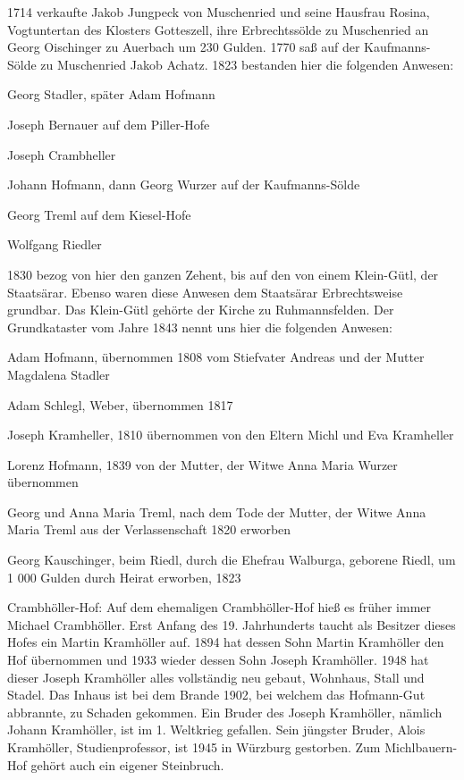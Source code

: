 \documentclass{book}
\begin{document}
1714 verkaufte Jakob Jungpeck von Muschenried und seine Hausfrau Rosina,
Vogtuntertan des Klosters Gotteszell, ihre Erbrechtssölde zu Muschenried an
Georg Oischinger zu Auerbach um 230 Gulden. 1770 saß auf der Kaufmanns-Sölde zu
Muschenried Jakob Achatz. 1823 bestanden hier die folgenden Anwesen:



Georg Stadler, später Adam Hofmann

Joseph Bernauer auf dem Piller-Hofe

Joseph Crambheller

Johann Hofmann, dann Georg Wurzer auf der Kaufmanns-Sölde

Georg Treml auf dem Kiesel-Hofe

Wolfgang Riedler



1830 bezog von hier den ganzen Zehent, bis auf den von einem Klein-Gütl, der
Staatsärar. Ebenso waren diese Anwesen dem Staatsärar Erbrechtsweise grundbar.
Das Klein-Gütl gehörte der Kirche zu Ruhmannsfelden. Der Grundkataster vom Jahre
1843 nennt uns hier die folgenden Anwesen:



Adam Hofmann, übernommen 1808 vom Stiefvater Andreas und der Mutter Magdalena
Stadler

Adam Schlegl, Weber, übernommen 1817

Joseph Kramheller, 1810 übernommen von den Eltern Michl und Eva Kramheller

Lorenz Hofmann, 1839 von der Mutter, der Witwe Anna Maria Wurzer übernommen

Georg und Anna Maria Treml, nach dem Tode der Mutter, der Witwe Anna Maria Treml
aus der Verlassenschaft 1820 erworben

Georg Kauschinger, beim Riedl, durch die Ehefrau Walburga, geborene Riedl, um 1
000 Gulden durch Heirat erworben, 1823



Crambhöller-Hof: Auf dem ehemaligen Crambhöller-Hof hieß es früher immer Michael
Crambhöller. Erst Anfang des 19. Jahrhunderts taucht als Besitzer dieses Hofes
ein Martin Kramhöller auf. 1894 hat dessen Sohn Martin Kramhöller den Hof
übernommen und 1933 wieder dessen Sohn Joseph Kramhöller. 1948 hat dieser Joseph
Kramhöller alles vollständig neu gebaut, Wohnhaus, Stall und Stadel. Das Inhaus
ist bei dem Brande 1902, bei welchem das Hofmann-Gut abbrannte, zu Schaden
gekommen. Ein Bruder des Joseph Kramhöller, nämlich Johann Kramhöller, ist im 1.
Weltkrieg gefallen. Sein jüngster Bruder, Alois Kramhöller, Studienprofessor,
ist 1945 in Würzburg gestorben. Zum Michlbauern-Hof gehört auch ein eigener
Steinbruch.
\end{document}
